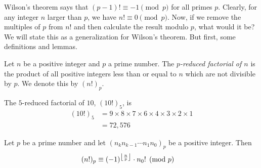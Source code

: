 Wilson's theorem says that $(p-1)! \equiv -1 \pmod p$ for all primes $p$. Clearly, for any integer $n$ larger than $p$, we have $n! \equiv 0 \pmod p$. Now, if we remove the multiples of $p$ from $n!$ and then calculate the result modulo $p$, what would it be? We will state this as a generalization for Wilson's theorem. But first, some definitions and lemmas.

	\begin{definition}
		Let $n$ be a positive integer and $p$ a prime number. The \textit{$p$-reduced factorial of $n$} is the product of all positive integers less than or equal to $n$ which are not divisible by $p$. We denote this by $(n!)_p$.
	\end{definition}

	\begin{example}
		The $5$-reduced factorial of $10$, $(10!)_5$, is
			\begin{align*}
				(10!)_5
					& = 9 \times 8 \times 7 \times 6 \times 4 \times 3 \times 2 \times 1\\
					& = 72,576
			\end{align*}
	\end{example}


	\begin{theorem}\label{thm:reducedfactorialmodp}
		Let $p$ be a prime number and let $(n_k n_{k-1}\cdots n_1 n_0)_p$ be a positive integer. Then
			\begin{align*}
				(n!)_p
					& \equiv (-1)^{\left\lfloor{\frac{n}{p}}\right\rfloor} \cdot n_0!\pmod p
			\end{align*}
	\end{theorem}

